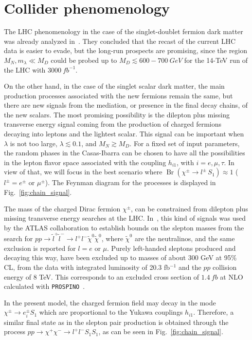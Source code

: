 \section{Collider phenomenology}
\label{sec:collider-phenomenology}

The LHC phenomenology in the case of the singlet-doublet fermion
dark matter was already analyzed in~\cite{Abe:2014gua}. They concluded that
the recast of the current LHC data is easier to evade, but the
long-run prospects are promising, since the region $M_N,m_\lambda\ll M_D$ could be 
probed up to $M_D\lesssim 600-\SI{700}{GeV}$ for the 14-TeV run of the LHC with 
$\SI{3000}{fb}^{-1}$. 

On the other hand, in the case of the singlet scalar dark matter, the
main production processes associated with the new fermions remain the
same, but there are new signals from the mediation, or presence in the
final decay chains, of the new scalars.
The most promising possibility is the dilepton plus missing
transverse energy signal coming from the production of
charged fermions decaying into leptons and the lightest scalar.
This signal can be important when $\lambda$ is
not too large, $\lambda\lesssim 0.1$, and $M_N\gtrsim M_D$. 
For a fixed set of input parameters, the random phases in the
Casas-Ibarra can be chosen to have all the possibilities in the lepton
flavor space associated with the coupling $h_{i1}$, with
$i=e,\mu,\tau$. 
In view of that, we will focus in the best scenario where
$\operatorname{Br}(\chi^\pm\to l^\pm \, S_1 )\approx 1$ ($l^\pm=e^\pm$ or
$\mu^\pm$). 
The Feynman diagram for the processes is displayed in
Fig.~\ref{fig:chain_signal}.

   
The mass of the  charged  Dirac fermion $\chi^{\pm}$, can be
constrained from dilepton plus missing transverse energy  searches at the  LHC.
In~\cite{Aad:2014vma}, this kind of signals was used by the ATLAS
collaboration to establish bounds on the slepton masses from the
search for $pp \rightarrow \tilde{l}^+\tilde{l}^- \rightarrow l^+l^-
\tilde{\chi}^0\tilde{\chi}^0$, where $\tilde{\chi}^{0}$ are the neutralinos,
and the same exclusion is reported for $l=e$ or $\mu$.
Purely left-handed sleptons produced and decaying this way, have been
excluded up to masses of about $300$ GeV at 95\% CL, from the data
with integrated luminosity of 20.3 fb$^{-1}$ and the $pp$ collision
energy of 8 TeV. 
This corresponds to an excluded cross section of $\SI{1.4}{fb}$ at NLO
calculated with \texttt{PROSPINO}~\cite{Beenakker:1996ed}.

In the present model, the charged fermion field may decay in the
mode $\chi^{\pm} \rightarrow e_i^{\pm}S_1$ which are
proportional to the Yukawa couplings $h_{i1}$. 
Therefore, a similar final state as in the slepton pair production is
obtained through the process $pp \rightarrow \chi^+\chi^- \rightarrow
l^+l^- S_1 S_1$, as can be seen in Fig.~\ref{fig:chain_signal}.


